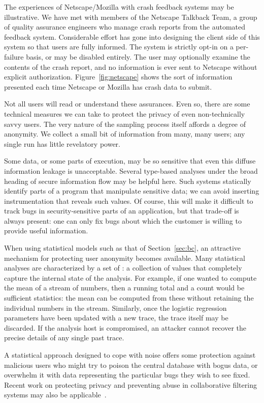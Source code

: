 The experiences of Netscape/Mozilla with crash feedback systems may be
illustrative.  We have met with members of the Netscape Talkback Team,
a group of quality assurance engineers who manage crash reports from
the automated feedback system.  Considerable effort has gone into
designing the client side of this system so that users are fully
informed.  The system is strictly opt-in on a per-failure basis, or
may be disabled entirely.  The user may optionally examine the
contents of the crash report, and no information is ever sent to
Netscape without explicit authorization.  Figure~\ref{fig:netscape}
shows the sort of information presented each time Netscape or Mozilla
has crash data to submit.

Not all users will read or understand these assurances.  Even so,
there are some technical measures we can take to protect the privacy
of even non-technically savvy users.  The very nature of the sampling
process itself affords a degree of anonymity.  We collect a small bit
of information from many, many users; any single run has little
revelatory power.

Some data, or some parts of execution, may be so sensitive that even
this diffuse information leakage is unacceptable.  Several type-based
analyses under the broad heading of secure information flow
\cite{Broadwell:2003:SSGSCI,1997:tapsoft:volpano,ZdZhNyMy2001} may be
helpful here.  Such systems statically identify parts of a program
that manipulate sensitive data; we can avoid inserting instrumentation
that reveals such values.  Of course, this will make it difficult to
track bugs in security-sensitive parts of an application, but that
trade-off is always present: one can only fix bugs about which 
the customer is willing to provide useful information.

When using statistical models such as that of Section~\ref{sec:bc}, an
attractive mechanism for protecting user anonymity becomes available.
Many statistical analyses are characterized by a set of
: a collection of values that
completely capture the internal state of the analysis.  For example,
if one wanted to compute the mean of a stream of numbers, then a
running total and a count would be sufficient statistics: the mean can
be computed from these without retaining the individual numbers in the
stream.  Similarly, once the logistic regression parameters have been
updated with a new trace, the trace itself may be discarded.  If the
analysis host is compromised, an attacker cannot recover the precise
details of any single past trace.

A statistical approach designed to cope with noise offers some
protection against malicious users who might try to poison the central
database with bogus data, or overwhelm it with data representing the
particular bugs they wish to see fixed.  Recent work on protecting
privacy and preventing abuse in collaborative filtering systems may
also be applicable~\cite{Canny2002,EC00*150}.


